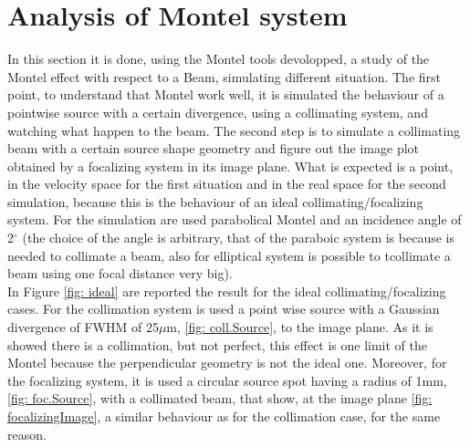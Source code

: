 \section{Analysis of Montel system}
In this section it is done, using the Montel tools devolopped, a study of the Montel effect with respect to a Beam, simulating different situation. The first point, to understand that Montel work well, it is simulated the behaviour of a pointwise source with a certain divergence, using a collimating system, and watching what happen to the beam. The  second step is to simulate a collimating beam with a certain source shape geometry and figure out the image plot obtained by a focalizing system in its image plane. What is expected is a point, in the velocity space for the first situation and in the real space for the second simulation, because this is the behaviour of an ideal collimating/focalizing system. For the simulation are used parabolical Montel and an incidence angle of 2$^{\circ} $ (the choice of the angle is arbitrary, that of the paraboic system is because is needed to collimate a beam, also for elliptical system is possible to tcollimate a beam using one focal distance very big).
\\
In Figure \ref{fig: ideal} are reported the result for the ideal collimating/focalizing cases.
For the collimation system is used a point wise source with a Gaussian divergence of FWHM of 25$\mu $m, \ref{fig: coll.Source}, to the image plane. As it is showed there is a collimation, but not perfect, this effect is one limit of the Montel because the perpendicular geometry is not the ideal one. Moreover, for the focalizing system, it is used a circular source spot having a radius of 1mm, \ref{fig: foc.Source}, with a collimated beam, that show, at the image plane \ref{fig: focalizingImage}, a similar behaviour as for the collimation case, for the same reason.
